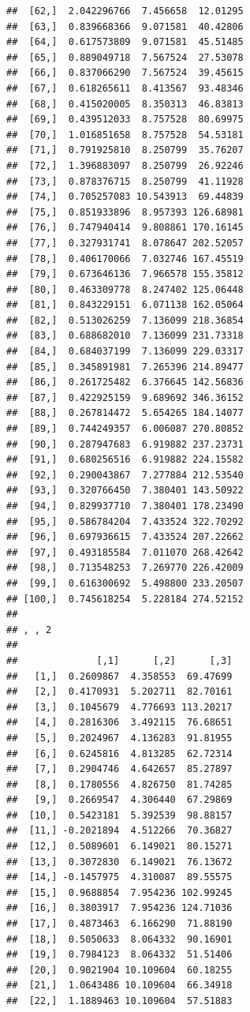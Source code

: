 \documentclass[article]{jss}\usepackage[]{graphicx}\usepackage[]{xcolor}
\makeatletter
\newenvironment{kframe}{%
 \def\at@end@of@kframe{}%
 \ifinner\ifhmode%
  \def\at@end@of@kframe{\end{minipage}}%
  \begin{minipage}{\columnwidth}%
 \fi\fi%
 \def\FrameCommand##1{\hskip\@totalleftmargin \hskip-\fboxsep
 \colorbox{shadecolor}{##1}\hskip-\fboxsep
     \hskip-\linewidth \hskip-\@totalleftmargin \hskip\columnwidth}%
 \MakeFramed {\advance\hsize-\width
   \@totalleftmargin\z@ \linewidth\hsize
   \@setminipage}}%
 {\par\unskip\endMakeFramed%
 \at@end@of@kframe}
\newenvironment{knitrout}{}{} %
\makeatother
\begin{document}
\begin{knitrout}
\begin{kframe}
\begin{verbatim}
##  [62,]  2.042296766  7.456658  12.01295
##  [63,]  0.839668366  9.071581  40.42806
##  [64,]  0.617573809  9.071581  45.51485
##  [65,]  0.889049718  7.567524  27.53078
##  [66,]  0.837066290  7.567524  39.45615
##  [67,]  0.618265611  8.413567  93.48346
##  [68,]  0.415020005  8.350313  46.83813
##  [69,]  0.439512033  8.757528  80.69975
##  [70,]  1.016851658  8.757528  54.53181
##  [71,]  0.791925810  8.250799  35.76207
##  [72,]  1.396883097  8.250799  26.92246
##  [73,]  0.878376715  8.250799  41.11928
##  [74,]  0.705257083 10.543913  69.44839
##  [75,]  0.851933896  8.957393 126.68981
##  [76,]  0.747940414  9.808861 170.16145
##  [77,]  0.327931741  8.078647 202.52057
##  [78,]  0.406170066  7.032746 167.45519
##  [79,]  0.673646136  7.966578 155.35812
##  [80,]  0.463309778  8.247402 125.06448
##  [81,]  0.843229151  6.071138 162.05064
##  [82,]  0.513026259  7.136099 218.36854
##  [83,]  0.688682010  7.136099 231.73318
##  [84,]  0.684037199  7.136099 229.03317
##  [85,]  0.345891981  7.265396 214.89477
##  [86,]  0.261725482  6.376645 142.56836
##  [87,]  0.422925159  9.689692 346.36152
##  [88,]  0.267814472  5.654265 184.14077
##  [89,]  0.744249357  6.006087 270.80852
##  [90,]  0.287947683  6.919882 237.23731
##  [91,]  0.680256516  6.919882 224.15582
##  [92,]  0.290043867  7.277884 212.53540
##  [93,]  0.320766450  7.380401 143.50922
##  [94,]  0.829937710  7.380401 178.23490
##  [95,]  0.586784204  7.433524 322.70292
##  [96,]  0.697936615  7.433524 207.22662
##  [97,]  0.493185584  7.011070 268.42642
##  [98,]  0.713548253  7.269770 226.42009
##  [99,]  0.616300692  5.498800 233.20507
## [100,]  0.745618254  5.228184 274.52152
## 
## , , 2
## 
##              [,1]      [,2]      [,3]
##   [1,]  0.2609867  4.358553  69.47699
##   [2,]  0.4170931  5.202711  82.70161
##   [3,]  0.1045679  4.776693 113.20217
##   [4,]  0.2816306  3.492115  76.68651
##   [5,]  0.2024967  4.136283  91.81955
##   [6,]  0.6245816  4.813285  62.72314
##   [7,]  0.2904746  4.642657  85.27897
##   [8,]  0.1780556  4.826750  81.74285
##   [9,]  0.2669547  4.306440  67.29869
##  [10,]  0.5423181  5.392539  98.88157
##  [11,] -0.2021894  4.512266  70.36827
##  [12,]  0.5089601  6.149021  80.15271
##  [13,]  0.3072830  6.149021  76.13672
##  [14,] -0.1457975  4.310087  89.55575
##  [15,]  0.9688854  7.954236 102.99245
##  [16,]  0.3803917  7.954236 124.71036
##  [17,]  0.4873463  6.166290  71.88190
##  [18,]  0.5050633  8.064332  90.16901
##  [19,]  0.7984123  8.064332  51.51406
##  [20,]  0.9021904 10.109604  60.18255
##  [21,]  1.0643486 10.109604  66.34918
##  [22,]  1.1889463 10.109604  57.51883

\end{verbatim}
\end{kframe}
\end{knitrout}
\end{document}
